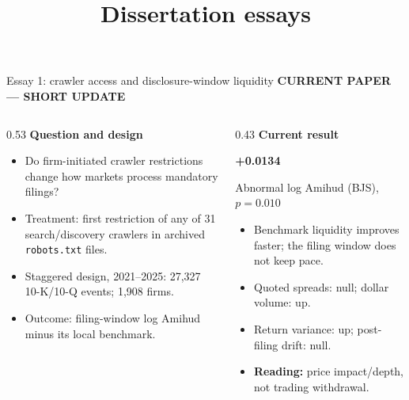 \documentclass[aspectratio=169,10pt]{beamer}
\title[Dissertation essays | Supervisor meeting | 8 Sep 2026]{Dissertation essays}
\newcommand{\eyebrow}[1]{%
  {\color{accent}\fontsize{7.3}{9}\selectfont\bfseries\MakeUppercase{#1}}\par\vspace{0.10cm}%
}
\newcommand{\smallhead}[1]{%
  {\fontsize{11}{13}\selectfont\bfseries #1}\par\vspace{0.08cm}%
}
\newcommand{\bodytext}{\fontsize{9.4}{12.1}\selectfont}
\newcommand{\smalltext}{\fontsize{8.1}{10.2}\selectfont}
\newcommand{\metric}[2]{%
  {\color{accent}\fontsize{25}{27}\selectfont\bfseries #1}\par
  {\color{muted}\fontsize{7.7}{9.4}\selectfont #2}%
}
\begin{document}
\begin{frame}[t]{Essay 1: crawler access and disclosure-window liquidity}
\eyebrow{Current paper --- short update}

\begin{columns}[T,onlytextwidth]
  \begin{column}{0.53\textwidth}
    \smallhead{Question and design}
    {\bodytext
    \begin{itemize}\setlength\itemsep{0.15cm}
      \item Do firm-initiated crawler restrictions change how markets process mandatory filings?
      \item Treatment: first restriction of any of 31 search/discovery crawlers in archived \texttt{robots.txt} files.
      \item Staggered design, 2021--2025: 27,327 10-K/10-Q events; 1,908 firms.
      \item Outcome: filing-window log Amihud minus its local benchmark.
    \end{itemize}}
  \end{column}
  \begin{column}{0.43\textwidth}
    \smallhead{Current result}
    \metric{+0.0134}{Abnormal log Amihud (BJS), $p=0.010$}
    \vspace{0.18cm}
    {\smalltext
    \begin{itemize}\setlength\itemsep{0.11cm}
      \item Benchmark liquidity improves faster; the filing window does not keep pace.
      \item Quoted spreads: null; dollar volume: up.
      \item Return variance: up; post-filing drift: null.
      \item \textbf{Reading:} price impact/depth, not trading withdrawal.
    \end{itemize}}
  \end{column}
\end{columns}
\end{frame}
\end{document}
